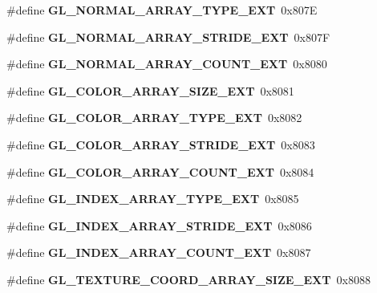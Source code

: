 \begin{DoxyCompactItemize}
\item 
\#define {\bfseries G\+L\+\_\+\+N\+O\+R\+M\+A\+L\+\_\+\+A\+R\+R\+A\+Y\+\_\+\+T\+Y\+P\+E\+\_\+\+E\+X\+T}~0x807\+E\label{_s_d_l__opengl_8h_a7f0b3bae5197df86f6d57146668a42ec}

\item 
\#define {\bfseries G\+L\+\_\+\+N\+O\+R\+M\+A\+L\+\_\+\+A\+R\+R\+A\+Y\+\_\+\+S\+T\+R\+I\+D\+E\+\_\+\+E\+X\+T}~0x807\+F\label{_s_d_l__opengl_8h_a7f0cac7197914dca1568adf3f2b4a36a}

\item 
\#define {\bfseries G\+L\+\_\+\+N\+O\+R\+M\+A\+L\+\_\+\+A\+R\+R\+A\+Y\+\_\+\+C\+O\+U\+N\+T\+\_\+\+E\+X\+T}~0x8080\label{_s_d_l__opengl_8h_a4a18c98d7e16648833f78116a7be9826}

\item 
\#define {\bfseries G\+L\+\_\+\+C\+O\+L\+O\+R\+\_\+\+A\+R\+R\+A\+Y\+\_\+\+S\+I\+Z\+E\+\_\+\+E\+X\+T}~0x8081\label{_s_d_l__opengl_8h_ab35f9ed698bfcdf369cfa6c8fcb15ec2}

\item 
\#define {\bfseries G\+L\+\_\+\+C\+O\+L\+O\+R\+\_\+\+A\+R\+R\+A\+Y\+\_\+\+T\+Y\+P\+E\+\_\+\+E\+X\+T}~0x8082\label{_s_d_l__opengl_8h_a40824c6b3c6c005b5eadce466ca89e6e}

\item 
\#define {\bfseries G\+L\+\_\+\+C\+O\+L\+O\+R\+\_\+\+A\+R\+R\+A\+Y\+\_\+\+S\+T\+R\+I\+D\+E\+\_\+\+E\+X\+T}~0x8083\label{_s_d_l__opengl_8h_ac77c238639594407fc52b54816ee5d33}

\item 
\#define {\bfseries G\+L\+\_\+\+C\+O\+L\+O\+R\+\_\+\+A\+R\+R\+A\+Y\+\_\+\+C\+O\+U\+N\+T\+\_\+\+E\+X\+T}~0x8084\label{_s_d_l__opengl_8h_acd66887ddd5fef4fe5170799bcc77189}

\item 
\#define {\bfseries G\+L\+\_\+\+I\+N\+D\+E\+X\+\_\+\+A\+R\+R\+A\+Y\+\_\+\+T\+Y\+P\+E\+\_\+\+E\+X\+T}~0x8085\label{_s_d_l__opengl_8h_a44a040d77b567d4ec32f839a14335e9f}

\item 
\#define {\bfseries G\+L\+\_\+\+I\+N\+D\+E\+X\+\_\+\+A\+R\+R\+A\+Y\+\_\+\+S\+T\+R\+I\+D\+E\+\_\+\+E\+X\+T}~0x8086\label{_s_d_l__opengl_8h_acbbf258b8d9d655b9d2e1573804567bb}

\item 
\#define {\bfseries G\+L\+\_\+\+I\+N\+D\+E\+X\+\_\+\+A\+R\+R\+A\+Y\+\_\+\+C\+O\+U\+N\+T\+\_\+\+E\+X\+T}~0x8087\label{_s_d_l__opengl_8h_a1b49eb4716b448b0f3ea7fcfb1ac9d8e}

\item 
\#define {\bfseries G\+L\+\_\+\+T\+E\+X\+T\+U\+R\+E\+\_\+\+C\+O\+O\+R\+D\+\_\+\+A\+R\+R\+A\+Y\+\_\+\+S\+I\+Z\+E\+\_\+\+E\+X\+T}~0x8088\label{_s_d_l__opengl_8h_a64adb8291e37a801fa3a49a11c9ac14c}


\end{DoxyCompactItemize}
